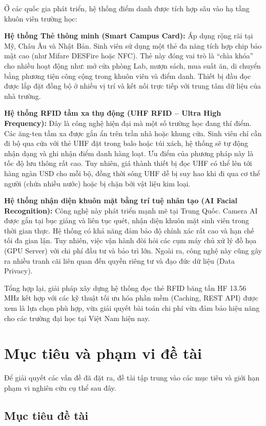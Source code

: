 \documentclass[12pt,a4paper]{report}
\begin{document}
Ở các quốc gia phát triển, hệ thống điểm danh được tích hợp sâu vào hạ tầng khuôn viên trường học:

\textbf{Hệ thống Thẻ thông minh (Smart Campus Card):}  
Áp dụng rộng rãi tại Mỹ, Châu Âu và Nhật Bản. Sinh viên sử dụng một thẻ đa năng tích hợp chip bảo mật cao (như Mifare DESFire hoặc NFC). Thẻ này đóng vai trò là ``chìa khóa'' cho nhiều hoạt động như: mở cửa phòng Lab, mượn sách, mua suất ăn, di chuyển bằng phương tiện công cộng trong khuôn viên và điểm danh. Thiết bị đầu đọc được lắp đặt đồng bộ ở nhiều vị trí và kết nối trực tiếp với trung tâm dữ liệu của nhà trường.

\textbf{Hệ thống RFID tầm xa thụ động (UHF RFID -- Ultra High Frequency):}  
Đây là công nghệ hiện đại mà một số trường học đang thí điểm. Các ăng-ten tầm xa được gắn ẩn trên trần nhà hoặc khung cửa. Sinh viên chỉ cần đi bộ qua cửa với thẻ UHF đặt trong balo hoặc túi xách, hệ thống sẽ tự động nhận dạng và ghi nhận điểm danh hàng loạt. Ưu điểm của phương pháp này là tốc độ lưu thông rất cao. Tuy nhiên, giá thành thiết bị đọc UHF có thể lên tới hàng ngàn USD cho mỗi bộ, đồng thời sóng UHF dễ bị suy hao khi đi qua cơ thể người (chứa nhiều nước) hoặc bị chặn bởi vật liệu kim loại.

\textbf{Hệ thống nhận diện khuôn mặt bằng trí tuệ nhân tạo (AI Facial Recognition):}  
Công nghệ này phát triển mạnh mẽ tại Trung Quốc. Camera AI được gắn tại bục giảng và liên tục quét, nhận diện khuôn mặt sinh viên trong thời gian thực. Hệ thống có khả năng đảm bảo độ chính xác rất cao và hạn chế tối đa gian lận. Tuy nhiên, việc vận hành đòi hỏi các cụm máy chủ xử lý đồ họa (GPU Server) với chi phí đầu tư và bảo trì lớn. Ngoài ra, công nghệ này cũng gây ra nhiều tranh cãi liên quan đến quyền riêng tư và đạo đức dữ liệu (Data Privacy).

Tổng hợp lại, giải pháp xây dựng hệ thống đọc thẻ RFID băng tần HF 13.56\,MHz kết hợp với các kỹ thuật tối ưu hóa phần mềm (Caching, REST API) được xem là lựa chọn phù hợp, vừa giải quyết bài toán chi phí vừa đảm bảo hiệu năng cho các trường đại học tại Việt Nam hiện nay.

\section{Mục tiêu và phạm vi đề tài}

Để giải quyết các vấn đề đã đặt ra, đề tài tập trung vào các mục tiêu và giới hạn phạm vi nghiên cứu cụ thể sau đây.

\subsection{Mục tiêu đề tài}
\end{document}
